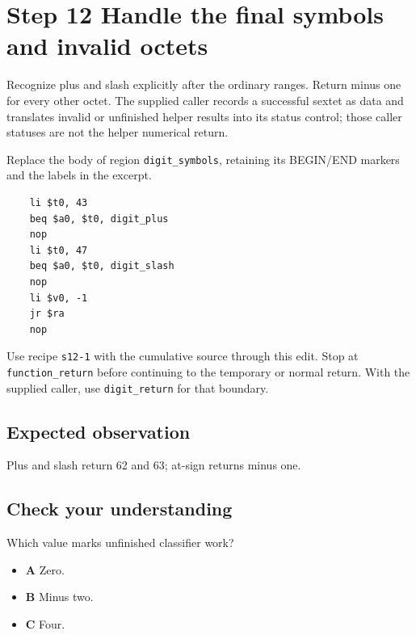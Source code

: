 \section{Step 12 Handle the final symbols and invalid octets}\label{base64-s12}

Recognize plus and slash explicitly after the ordinary ranges. Return minus one for every other octet. The supplied caller records a successful sextet as data and translates invalid or unfinished helper results into its status control; those caller statuses are not the helper numerical return.

Replace the body of region \texttt{digit\_symbols}, retaining its BEGIN/END markers and the labels in the excerpt.

\begin{verbatim}
    li $t0, 43
    beq $a0, $t0, digit_plus
    nop
    li $t0, 47
    beq $a0, $t0, digit_slash
    nop
    li $v0, -1
    jr $ra
    nop
\end{verbatim}

Use recipe \texttt{s12-1} with the cumulative source through this edit. Stop at \texttt{function\_return} before continuing to the temporary or normal return. With the supplied caller, use \texttt{digit\_return} for that boundary.

\subsection{Expected observation}
Plus and slash return 62 and 63; at-sign returns minus one.

\subsection{Check your understanding}
Which value marks unfinished classifier work?

\begin{itemize}
  \item \textbf{A} Zero.
  \item \textbf{B} Minus two.
  \item \textbf{C} Four.
\end{itemize}
